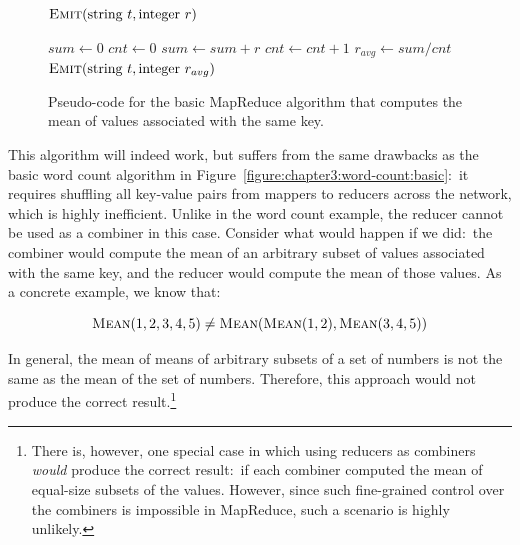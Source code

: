 \begin{figure}[t]
\algrenewcommand{}
\algrenewcommand{}
  \begin{algorithmic}[1]
    \State $\textsc{Emit}(\textrm{string }t, \textrm{integer }r)$
    \EndProcedure
    \EndFunction
  \end{algorithmic}

  \begin{algorithmic}[1]
    \State $sum \gets 0$
    \State $cnt \gets 0$
    \State $sum \gets sum + r$
    \State $cnt \gets cnt + 1$
    \EndFor
    \State $r_{avg} \gets sum/cnt$
    \State $\textsc{Emit}(\textrm{string }t, \textrm{integer } r_{avg})$
    \EndProcedure
    \EndFunction
  \end{algorithmic}
  \caption{Pseudo-code for the basic MapReduce algorithm that computes
    the mean of values associated with the same key.}
\label{figure:chapter3:average}
\end{figure}

This algorithm will indeed work, but suffers from the same drawbacks
as the basic word count algorithm in
Figure~\ref{figure:chapter3:word-count:basic}:\ it requires shuffling
all key-value pairs from mappers to reducers across the network, which
is highly inefficient.  Unlike in the word count example, the reducer
cannot be used as a combiner in this case.  Consider what would happen
if we did:\ the combiner would compute the mean of an arbitrary subset
of values associated with the same key, and the reducer would compute
the mean of those values.  As a concrete example, we know that:

\begin{equation}
\textsc{Mean}(1, 2, 3, 4, 5) \ne \textsc{Mean}( \textsc{Mean}(1, 2), \textsc{Mean}(3, 4, 5))
\end{equation}

\noindent In general, the mean of means of arbitrary subsets of a set
of numbers is not the same as the mean of the set of numbers.
Therefore, this approach would not produce the correct
result.\footnote{There is, however, one special case in which using
  reducers as combiners {\it would} produce the correct result:\ if
  each combiner computed the mean of equal-size subsets of the values.
  However, since such fine-grained control over the combiners is
  impossible in MapReduce, such a scenario is highly unlikely.}

